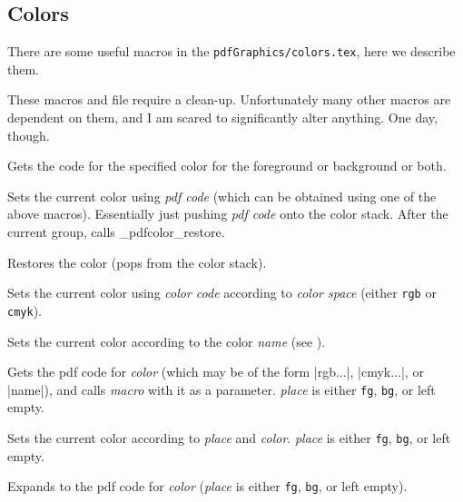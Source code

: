 \subsection{Colors}

There are some useful macros in the {\tt pdfGraphics/colors.tex}, here we describe them.

\bwarning
These macros and file require a clean-up.
Unfortunately many other macros are dependent on them, and I am scared to significantly alter anything.
One day, though.
\eppbox

Gets the code for the specified color for the foreground or background or both.
\emacroexp

Sets the current color using {\it pdf code} (which can be obtained using one of the above macros).
Essentially just pushing {\it pdf code} onto the color stack.
After the current group, calls \gotomacro\_pdfcolor_restore.
\emacroexp

Restores the color (pops from the color stack).
\emacroexp

Sets the current color using {\it color code} according to {\it color space} (either {\tt rgb} or {\tt cmyk}).
\emacroexp

Sets the current color according to the color {\it name} (see \gotomacro\definecolor).
\emacroexp

Gets the pdf code for {\it color} (which may be of the form \inlinecode|rgb{...}|, \inlinecode|cmyk{...}|, or \inlinecode|{name}|), and calls {\it macro} with it as a parameter.
{\it place} is either {\tt fg}, {\tt bg}, or left empty.
\emacroexp

Sets the current color according to {\it place} and {\it color}.
{\it place} is either {\tt fg}, {\tt bg}, or left empty.
\emacroexp

Expands to the pdf code for {\it color} ({\it place} is either {\tt fg}, {\tt bg}, or left empty).
\emacroexp

